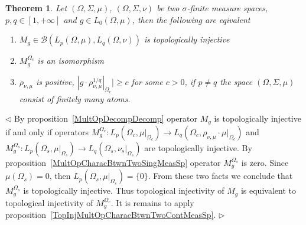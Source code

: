 \documentclass[12pt]{article}
\newtheorem{theorem}{Theorem}[subsection]
\newenvironment{proof}{\par $\triangleleft$}{$\triangleright$}
\begin{document}
\begin{theorem}\label{TopInjMultOpCharacBtwnTwoMeasSp}
    Let $(\Omega,\Sigma,\mu)$, $(\Omega,\Sigma,\nu)$ be two $\sigma$-finite
    measure spaces, $p,q\in[1,+\infty]$ and $g\in L_0(\Omega,\mu)$, then the
    following are eqivalent
    \begin{enumerate}[label = (\roman*)]
        \item $M_g\in\mathcal{B}(L_p(\Omega,\mu), L_q(\Omega,\nu))$ is
              topologically injective

        \item $M_g^{\Omega_c}$ is an isomorphism

        \item $\rho_{\nu,\mu}$ is positive,
              $|g\cdot\rho_{\nu,\mu}^{1/q}|_{\Omega_c}|\geq c$ for some $c>0$,
              if $p\neq q$ the space $(\Omega,\Sigma,\mu)$ consist of
              finitely many atoms.
    \end{enumerate}
\end{theorem}
\begin{proof}
    By proposition~\ref{MultOpDecompDecomp} operator $M_g$ is topologically
    injective if and only if operators
    $M_g^{\Omega_c}:L_p(\Omega_c,\mu|_{\Omega_c})\to
        L_q(\Omega_c,\rho_{\nu,\mu}\cdot\mu|_{\Omega_c})$ and
    $M_g^{\Omega_s}:L_p(\Omega_s,\mu|_{\Omega_s})\to
        L_q(\Omega_s,\nu_s|_{\Omega_s})$ are topologically injective. By
    proposition~\ref{MultOpCharacBtwnTwoSingMeasSp} operator $M_g^{\Omega_s}$ is
    zero. Since $\mu(\Omega_s)=0$, then $L_p(\Omega_s,\mu|_{\Omega_s})= \{0 \}$.
    From these two facts we conclude that $M_g^{\Omega_s}$ is topologically
    injective. Thus topological injectivity of $M_g$ is equivalent to
    topological injectivity of  $M_g^{\Omega_c}$. It is remains to apply
    proposition~\ref{TopInjMultOpCharacBtwnTwoContMeasSp}.
\end{proof}
\end{document}
